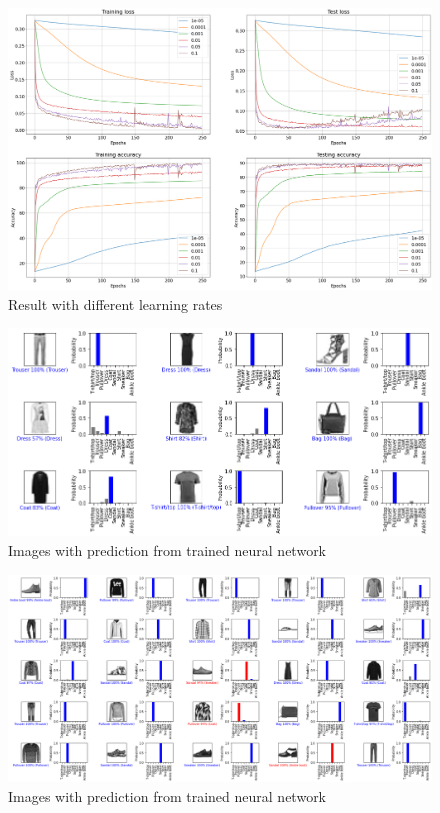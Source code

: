 \documentclass[14pt, a4paper]{article}
\numberwithin{equation}{section}
\numberwithin{algorithm}{section}
\numberwithin{figure}{section}
\begin{document}
\begin{figure}[h!]
  \centering
  \includegraphics[width=15cm]{learning_rate_comparisons.png}
  \caption{Result with different learning rates}
\end{figure}

\begin{figure}[h!]
  \centering
  \includegraphics[width=12cm]{images_with_predictions_1.png}
  \caption{Images with prediction from trained neural network}
\end{figure}

\begin{figure}[h!]
  \centering
  \includegraphics[width=15cm]{images_with_predictions_2.png}
  \caption{Images with prediction from trained neural network}
\end{figure}
\end{document}
